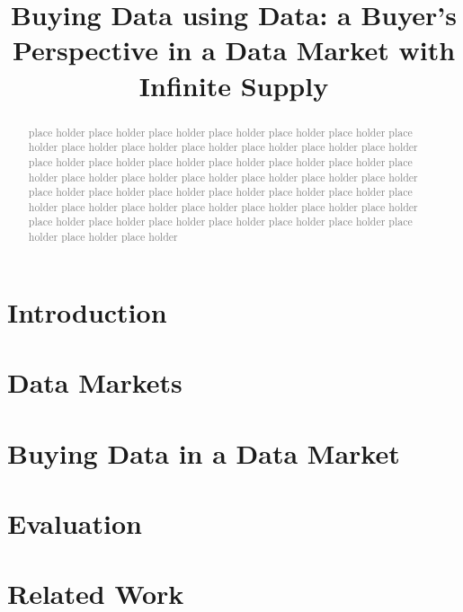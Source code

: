 \documentclass[sigconf,anonymous,review]{acmart}
\newcommand{\todo}[1]{\textcolor{gray}{{#1}}} %
\begin{document}
	\title{Buying Data using Data: a Buyer's Perspective in a Data Market with Infinite Supply}
	
	\begin{abstract}
	\todo{place holder place holder place holder place holder place holder place holder}
	\todo{place holder place holder place holder place holder place holder place holder}
	\todo{place holder place holder place holder place holder place holder place holder}
	\todo{place holder place holder place holder place holder place holder place holder}
	\todo{place holder place holder place holder place holder place holder place holder}
	\todo{place holder place holder place holder place holder place holder place holder}
	\todo{place holder place holder place holder place holder place holder place holder}
	\todo{place holder place holder place holder place holder place holder place holder}
	\end{abstract}
	\maketitle
	
	\section{Introduction}\label{sec:introduction}
	
	\section{Data Markets}\label{sec:datamarket}
	
	\section{Buying Data in a Data Market}\label{sec:model}
	
	\section{Evaluation}\label{sec:eval}
	
	\section{Related Work}\label{sec:related}
	
	
	
	
\end{document}
